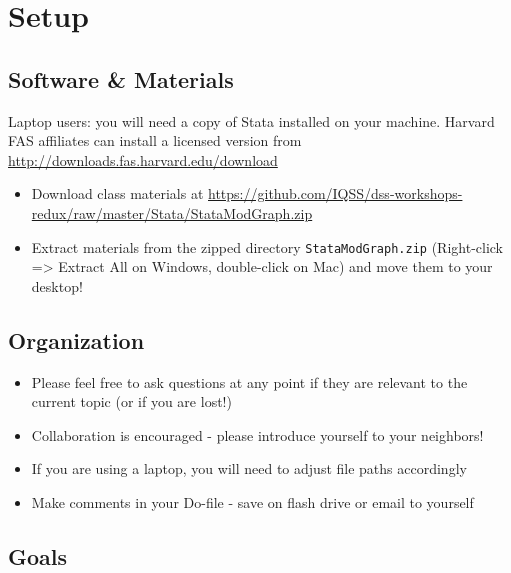 \documentclass[]{book}
\providecommand{\tightlist}{%
  \setlength{\itemsep}{0pt}\setlength{\parskip}{0pt}}
\begin{document}
\section{Setup}\label{setup-8}

\subsection{Software \& Materials}\label{software-materials-8}

Laptop users: you will need a copy of Stata installed on your machine.
Harvard FAS affiliates can install a licensed version from
\url{http://downloads.fas.harvard.edu/download}

\begin{itemize}
\tightlist
\item
  Download class materials at
  \url{https://github.com/IQSS/dss-workshops-redux/raw/master/Stata/StataModGraph.zip}
\item
  Extract materials from the zipped directory \texttt{StataModGraph.zip}
  (Right-click =\textgreater{} Extract All on Windows, double-click on
  Mac) and move them to your desktop!
\end{itemize}

\subsection{Organization}\label{organization-2}

\begin{itemize}
\tightlist
\item
  Please feel free to ask questions at any point if they are relevant to
  the current topic (or if you are lost!)
\item
  Collaboration is encouraged - please introduce yourself to your
  neighbors!
\item
  If you are using a laptop, you will need to adjust file paths
  accordingly
\item
  Make comments in your Do-file - save on flash drive or email to
  yourself
\end{itemize}

\subsection{Goals}\label{goals-7}
\end{document}
